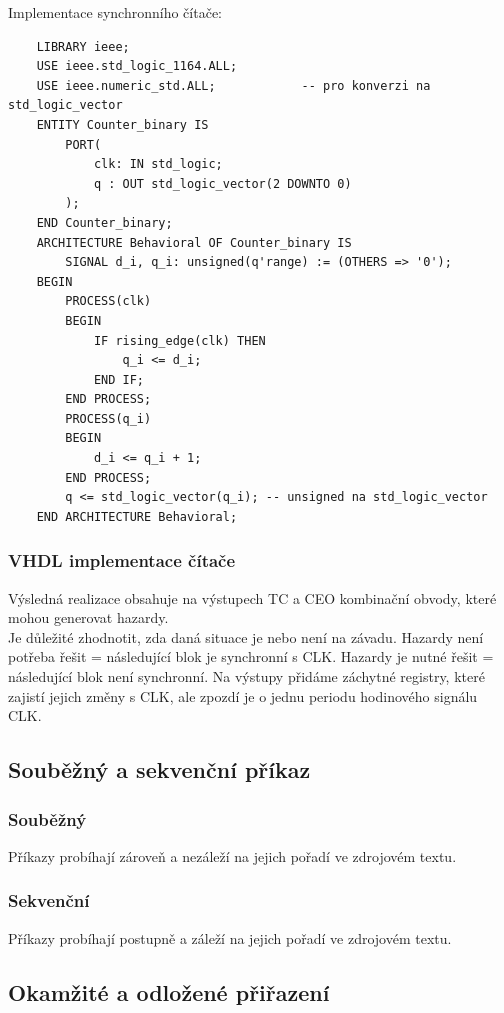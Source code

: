 Implementace synchronního čítače:\\
\begin{lstlisting}
    LIBRARY ieee;
    USE ieee.std_logic_1164.ALL;
    USE ieee.numeric_std.ALL;            -- pro konverzi na std_logic_vector
    ENTITY Counter_binary IS
        PORT(
            clk: IN std_logic;
            q : OUT std_logic_vector(2 DOWNTO 0)
        );
    END Counter_binary;
    ARCHITECTURE Behavioral OF Counter_binary IS
        SIGNAL d_i, q_i: unsigned(q'range) := (OTHERS => '0');
    BEGIN
        PROCESS(clk)
        BEGIN
            IF rising_edge(clk) THEN
                q_i <= d_i;             
            END IF;
        END PROCESS;
        PROCESS(q_i)
        BEGIN
            d_i <= q_i + 1;
        END PROCESS;
        q <= std_logic_vector(q_i); -- unsigned na std_logic_vector
    END ARCHITECTURE Behavioral;
\end{lstlisting}

\subsubsection{VHDL implementace čítače}
Výsledná realizace obsahuje na výstupech TC a CEO kombinační obvody, které mohou generovat hazardy.\\
Je důležité zhodnotit, zda daná situace je nebo není na závadu. Hazardy není potřeba řešit = následující blok je synchronní s CLK. Hazardy je nutné řešit = následující blok není synchronní. Na výstupy přidáme záchytné registry, které zajistí jejich změny s CLK, ale zpozdí je o jednu periodu hodinového signálu CLK.\\

\subsection{Souběžný a sekvenční příkaz}
\subsubsection{Souběžný}
Příkazy probíhají zároveň a nezáleží na jejich pořadí ve zdrojovém textu.\\
\subsubsection{Sekvenční}
Příkazy probíhají postupně a záleží na jejich pořadí ve zdrojovém textu.\\
\subsection{Okamžité a odložené přiřazení}
